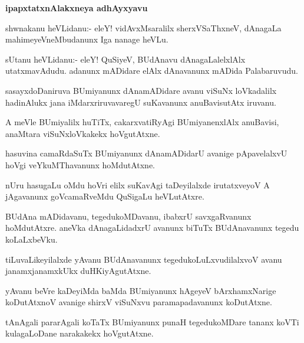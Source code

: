 \begin{center}
\textbf{\large ipapxtatxnAlakxneya adhAyxyavu}
\end{center}

\begin{mng}
shwnakanu heVLidanu:- eleY! vidAvxMsaralilx sherxVSaThxneV, dAnagaLa mahimeyeVneMbudanunx Iga nanage heVLu.
\end{mng}

\begin{mng}
sUtanu heVLidanu:- eleY! QuSiyeV, BUdAnavu dAnagaLalelxlAlx utatxmavAdudu. adanunx mADidare elAlx dAnavanunx mADida Palabaruvudu.
\end{mng}

\begin{mng}
sasayxdoDaniruva BUmiyanunx dAnamADidare avanu viSuNx loVkadalilx hadinAlukx jana iMdarxriruvavaregU suKavanunx anuBavisutAtx iruvanu.
\end{mng}

\begin{mng}
A meVle BUmiyalilx huTiTx, cakarxvatiRyAgi BUmiyanenxlAlx anuBavisi, anaMtara viSuNxloVkakekx hoVgutAtxne.
\end{mng}

\begin{mng}
hasuvina camaRdaSuTx BUmiyanunx dAnamADidarU avanige pApavelalxvU hoVgi veYkuMThavanunx hoMdutAtxne.
\end{mng}

\begin{mng}
nUru hasugaLu oMdu hoVri elilx suKavAgi taDeyilalxde irutatxveyoV A jAgavanunx goVcamaRveMdu QuSigaLu heVLutAtxre.
\end{mng}

\begin{mng}
BUdAna mADidavanu, tegedukoMDavanu, ibabxrU savxgaRvanunx hoMdutAtxre. aneVka dAnagaLidadxrU avanunx biTuTx BUdAnavanunx tegedu koLaLxbeVku.
\end{mng}

\begin{mng}
tiLuvaLikeyilalxde yAvanu BUdAnavanunx tegedukoLuLxvudilalxvoV avanu janamxjanamxkUkx duHKiyAgutAtxne.
\end{mng}

\begin{mng}
yAvanu beVre kaDeyiMda baMda BUmiyanunx hAgeyeV bArxhamxNarige koDutAtxnoV avanige shirxV viSuNxvu paramapadavanunx koDutAtxne.
\end{mng}

\begin{mng}
tAnAgali pararAgali koTaTx BUmiyanunx punaH tegedukoMDare tananx koVTi kulagaLoDane narakakekx hoVgutAtxne.
\end{mng}

